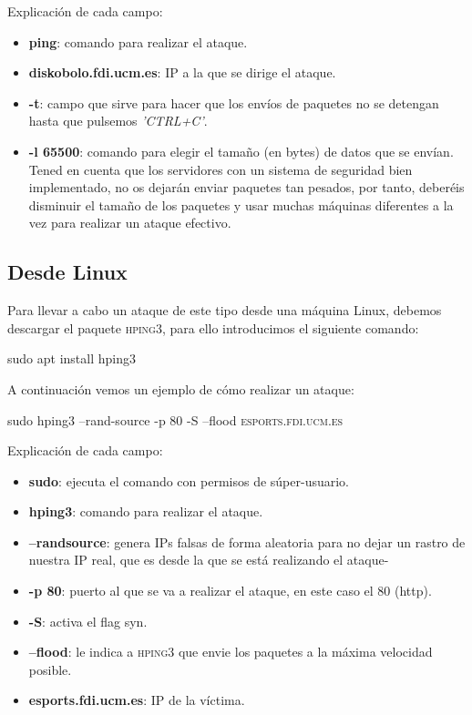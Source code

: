 Explicación de cada campo:
\begin{itemize}
    \item \textbf{ping}: comando para realizar el ataque.
    \item \textbf{diskobolo.fdi.ucm.es}: IP a la que se dirige el ataque.
    \item \textbf{-t}: campo que sirve para hacer que los envíos de paquetes no se detengan hasta que pulsemos \textit{'CTRL+C'}.
    \item \textbf{-l 65500}: comando para elegir el tamaño (en bytes) de datos que se envían. Tened en cuenta que los servidores con un sistema de seguridad bien implementado, no os dejarán enviar paquetes tan pesados, por tanto, deberéis disminuir el tamaño de los paquetes y usar muchas máquinas diferentes a la vez para realizar un ataque efectivo.
\end{itemize}

\subsection{Desde Linux}
Para llevar a cabo un ataque de este tipo desde una máquina Linux, debemos descargar el paquete \textsc{hping3}, para ello introducimos el siguiente comando:
\begin{tcolorbox}[colframe=black!75!red]
 \begin{center}
    sudo apt install hping3
 \end{center}
\end{tcolorbox}
A continuación vemos un ejemplo de cómo realizar un ataque:
\begin{tcolorbox}[colframe=black!75!red]
 \begin{center}
     sudo hping3 --rand-source -p 80 -S --flood \textsc{esports.fdi.ucm.es}
 \end{center}
\end{tcolorbox}

Explicación de cada campo:
\begin{itemize}
    \item \textbf{sudo}: ejecuta el comando con permisos de súper-usuario.
    \item \textbf{hping3}: comando para realizar el ataque.
    \item \textbf{--randsource}: genera IPs falsas de forma aleatoria para no dejar un rastro de nuestra IP real, que es desde la que se está realizando el ataque-
    \item \textbf{-p 80}: puerto al que se va a realizar el ataque, en este caso el 80 (http).
    \item \textbf{-S}: activa el flag syn.
    \item \textbf{--flood}: le indica a \textsc{hping3} que envie los paquetes a la máxima velocidad posible.
     \item \textbf{esports.fdi.ucm.es}: IP de la víctima.
\end{itemize}